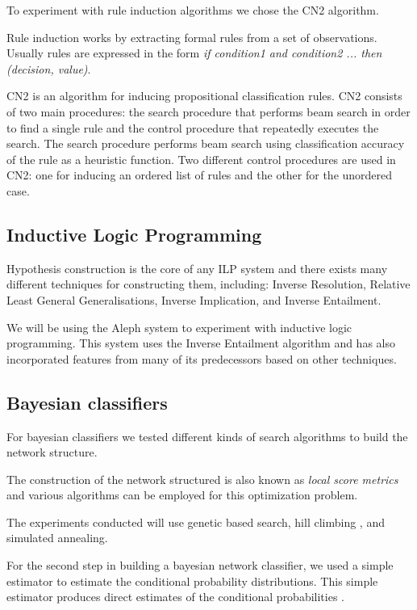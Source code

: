 \documentclass[a4paper]{llncs}
\begin{document}
To experiment with rule induction algorithms we chose the CN2 \cite{cn2} algorithm.

Rule induction works by extracting formal rules from a set of observations.
Usually rules are expressed in the form \textit{if condition1 and condition2 ... then (decision, value)}.

CN2 is an algorithm for inducing 
propositional classification rules. CN2 consists of two main procedures: the 
search procedure that performs beam search in order to find a single rule and 
the control procedure that repeatedly executes the search. 
The search procedure performs beam search using classification accuracy 
of the rule as a heuristic function.
Two different control procedures are used in CN2: one for inducing an ordered 
list of rules and the other for the unordered case.

\subsection{Inductive Logic Programming}

Hypothesis construction is the core of any ILP system and there exists many different techniques for constructing them, including: Inverse Resolution, Relative Least General Generalisations, Inverse Implication, and Inverse Entailment.

We will be using the Aleph system \cite{aleph} to experiment with inductive logic programming. This system
uses the Inverse Entailment algorithm and has also incorporated features from many of its predecessors based on other techniques.

\subsection{Bayesian classifiers}

For bayesian classifiers we tested different kinds of search algorithms to build
the network structure.

The construction of the network structured is also known as
\textit{local score metrics} and various algorithms can be employed for this optimization problem.

The experiments conducted will use genetic based search, hill climbing \cite{bayes3}, and simulated annealing.

For the second step in building a bayesian network classifier, we used a
simple estimator to estimate the conditional probability distributions.
This simple estimator produces
direct estimates of the conditional probabilities \cite{bayes_weka}. 
\end{document}
